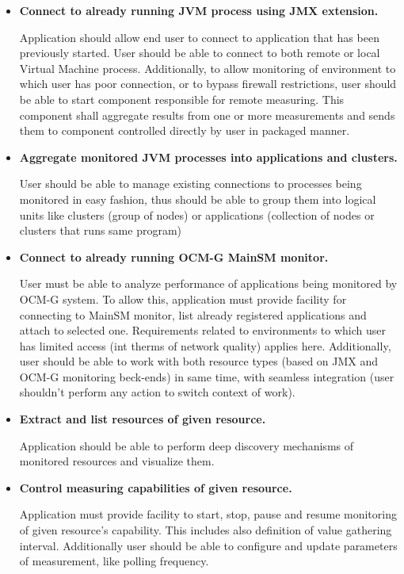 \begin{itemize}
 \item {\bf Connect to already running JVM process using JMX extension.} 

Application should allow end user to connect to application that has been previously started. User should be able to
connect to both remote or local Virtual Machine process. Additionally, to allow monitoring of environment to which user
has poor connection, or to bypass firewall restrictions, user should be able to start component responsible for remote
measuring. This component shall aggregate results from one or more measurements and sends them to component controlled
directly by user in packaged manner.

 \item {\bf Aggregate monitored JVM processes into applications and clusters.}

User should be able to manage existing connections to processes being monitored in easy fashion, thus should be able to
group them into logical units like clusters (group of nodes) or applications (collection of nodes or clusters that
runs same program)

 \item {\bf Connect to already running OCM-G MainSM monitor.}

User must be able to analyze performance of applications being monitored by OCM-G system. To allow
this, application must provide facility for connecting to MainSM monitor, list already registered applications and
attach to selected one. Requirements related to environments to which user has limited access (int therms of
network quality) applies here. Additionally, user should be able to work with both resource types (based on JMX and
OCM-G monitoring beck-ends) in same time, with seamless integration (user shouldn't perform any action to switch
context of work).

 \item {\bf Extract and list resources of given resource.}

Application should be able to perform deep discovery mechanisms of monitored resources and visualize them.

 \item {\bf Control measuring capabilities of given resource.}

Application must provide facility to start, stop, pause and resume monitoring of given resource's capability. This
includes also definition of value gathering interval. Additionally user should be able to configure and update
parameters of measurement, like polling frequency. 


\end{itemize}
